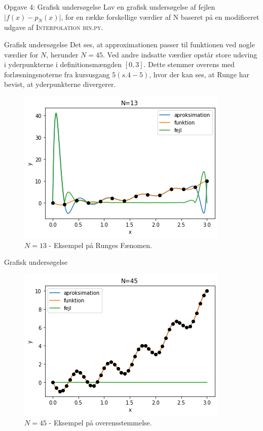 \begin{frame}{Opgave 4: Grafisk undersøgelse}
    Lav en grafisk undersøgelse af fejlen $\lvert f(x)-p_N(x) \rvert$, for en række forskellige værdier af N baseret på en modificeret udgave af \textsc{Interpolation bin.py.}
\end{frame}

\begin{frame}{Grafisk undersøgelse}
    Det ses, at approximationen passer til funktionen ved nogle værdier for $N$, herunder $N = 45$. 
    Ved andre indsatte værdier opstår store udsving i yderpunkterne i definitionsmængden $[0,3]$.
    Dette stemmer overens med forlæsningsnoterne fra kursusgang $5(s.4-5)$, hvor der kan ses, at Runge har bevist, at yderpunkterne divergerer.
    \begin{figure}[h!]
    \begin{center}
    \includegraphics[scale=0.5]{Images/N=13.png}
    \end{center}
    \caption{$N = 13$ - Eksempel på Runges Fænomen.}
    \end{figure} 
\end{frame}

\begin{frame}{Grafisk undersøgelse}
    \begin{figure}[h!]
    \begin{center}
    \includegraphics[scale=0.5]{Images/N=45.png}
    \end{center}
    \caption{$N = 45$ - Eksempel på overensstemmelse.}
    \end{figure}
\end{frame}

